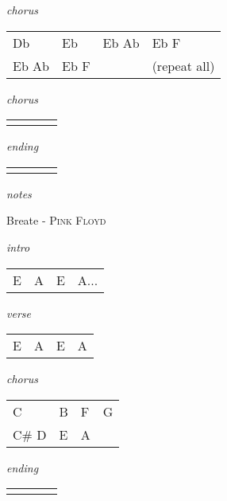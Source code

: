 \documentclass[12pt]{article}
\begin{document}
\textit{chorus}

\begin{tabular}{|P{1.25in}|P{1.25in}|P{1.25in}|P{1.25in}|}
  Db   &  Eb &  Eb Ab &  Eb F \\
  Eb Ab &  Eb F  &    &  (repeat all)  \\
\end{tabular}

\textit{chorus}

\begin{tabular}{|P{1.25in}|P{1.25in}|P{1.25in}|P{1.25in}|}
    &   &   &   \\
\end{tabular}

\textit{ending}

\begin{tabular}{|P{1.25in}|P{1.25in}|P{1.25in}|P{1.25in}|}
    &   &   &   \\
\end{tabular}

\textit{notes}

\newpage

{\Huge Breate} {\huge - \textsc{Pink Floyd}}

\huge
\textit{intro}

\begin{tabular}{|P{1.25in}|P{1.25in}|P{1.25in}|P{1.25in}|}
  E  &  A &  E &  A... \\

\end{tabular}

\textit{verse}

\begin{tabular}{|P{1.25in}|P{1.25in}|P{1.25in}|P{1.25in}|}
   E &  A &  E &  A \\
\end{tabular}

\textit{chorus}

\begin{tabular}{|P{1.25in}|P{1.25in}|P{1.25in}|P{1.25in}|}
  C  & B  &  F &  G \\
  C# D & E & A & \\
\end{tabular}

\textit{ending}

\begin{tabular}{|P{1.25in}|P{1.25in}|P{1.25in}|P{1.25in}|}
    &   &   &   \\
\end{tabular}
\end{document}
